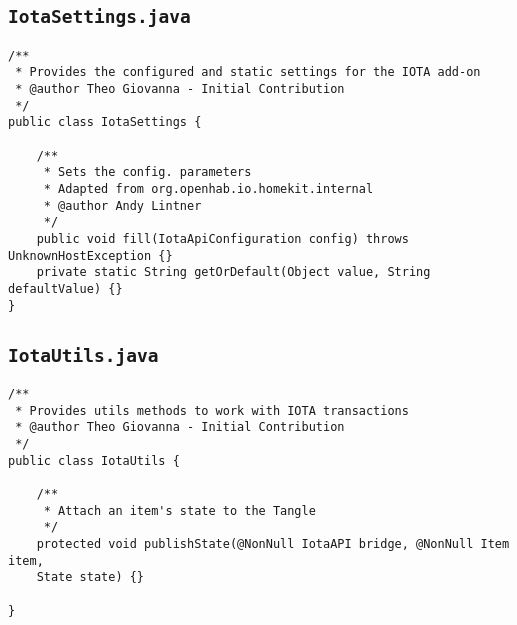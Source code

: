 \documentclass[a4paper,10pt]{article}
\begin{document}
\newpage 

\subsection{\texttt{IotaSettings.java}}

\begin{verbatim}
/**
 * Provides the configured and static settings for the IOTA add-on
 * @author Theo Giovanna - Initial Contribution
 */
public class IotaSettings {

	/**
	 * Sets the config. parameters
	 * Adapted from org.openhab.io.homekit.internal
	 * @author Andy Lintner
	 */
	public void fill(IotaApiConfiguration config) throws UnknownHostException {}
	private static String getOrDefault(Object value, String defaultValue) {}
}

\end{verbatim}

\subsection{\texttt{IotaUtils.java}}

\begin{verbatim}
/**
 * Provides utils methods to work with IOTA transactions
 * @author Theo Giovanna - Initial Contribution
 */
public class IotaUtils {
	
	/**
	 * Attach an item's state to the Tangle
	 */
	protected void publishState(@NonNull IotaAPI bridge, @NonNull Item item, 
	State state) {}
	
}
\end{verbatim}
\end{document}
